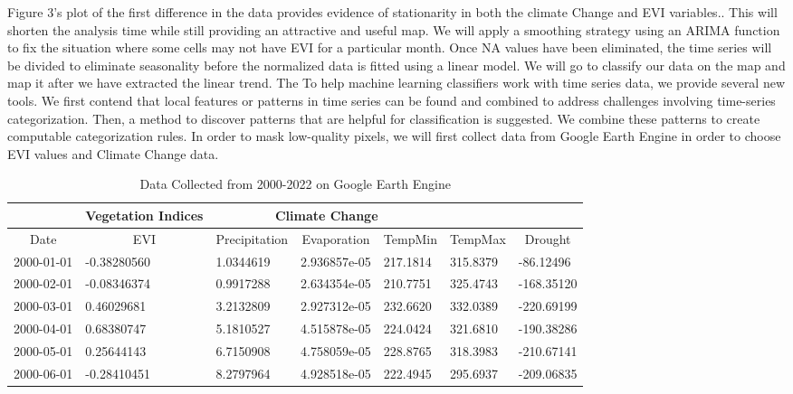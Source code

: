  Figure 3's plot of the first difference in the data provides evidence of stationarity in both the climate Change and EVI variables.. This will shorten the analysis time while still providing an attractive and useful map. We will apply a smoothing strategy using an ARIMA function to fix the situation where some cells may not have  EVI for a particular month. Once NA values have been eliminated, the time series will be divided to eliminate seasonality before the normalized data is fitted using a linear model. We will go to classify our data on the map and map it after we have extracted the linear trend.
The 
To help machine learning classifiers work with time series data, we provide several new tools. We first contend that local features or patterns in time series can be found and combined to address challenges involving time-series categorization. Then, a method to discover patterns that are helpful for classification is suggested. We combine these patterns to create computable categorization rules. In order to mask low-quality pixels, we will first collect data from Google Earth Engine in order to choose  EVI values and Climate Change data.
\begin{table}[]
	\label{DataFrame}
	\caption{Data Collected from 2000-2022 on Google Earth Engine }
	\centering
	\begin{tabularx}{\textwidth}{@{}cllllll@{}}
		\toprule
		& \multicolumn{1}{c}{Vegetation Indices}   & \multicolumn{3}{c}{Climate Change}  \\ \midrule
		\multicolumn{1}{c}{Date} & \multicolumn{1}{c}{EVI} & \multicolumn{1}{c}{Precipitation} & \multicolumn{1}{c}{Evaporation} & \multicolumn{1}{c}{TempMin} & \multicolumn{1}{c}{TempMax} &\multicolumn{1}{c}{Drought}\\ \midrule
		
		
		2000-01-01&	-0.38280560&	1.0344619&	2.936857e-05&	217.1814&	315.8379&	-86.12496\\
		2000-02-01&	-0.08346374&	0.9917288&	2.634354e-05&	210.7751&	325.4743&	-168.35120\\
		2000-03-01&	0.46029681&	3.2132809&	2.927312e-05&	232.6620&	332.0389&	-220.69199\\
		2000-04-01&	0.68380747&	5.1810527&	4.515878e-05&	224.0424&	321.6810&	-190.38286\\
		2000-05-01&	0.25644143&	6.7150908&	4.758059e-05&	228.8765&	318.3983&	-210.67141\\
		2000-06-01&	-0.28410451&	8.2797964&	4.928518e-05&	222.4945&	295.6937&	-209.06835\\\bottomrule
		
	\end{tabularx}
\end{table}
